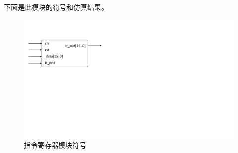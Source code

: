 \documentclass[titlepage, 11pt]{article}
\begin{document}
		\par 下面是此模块的符号和仿真结果。
		\begin{figure}[H]
			\includegraphics[scale=0.5]{19.pdf}
			\caption*{指令寄存器模块符号}
		\end{figure}
\end{document}
